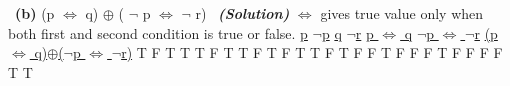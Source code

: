 \documentclass[a4 paper]{article}
\numberwithin{equation}{section}
\newcommand{\subproblem}[1]{~\newline\textbf{(#1)}}
\newcommand{\solution}{~\newline\textbf{\textit{(Solution)}} }
\newcommand{\0}{\mathbf{0}}
\begin{document}
\subproblem{b} (p $\iff$ q) $\oplus$ ( $\neg$ p $\iff$ $\neg$ r)
\solution 
\newline
\newline
    $\iff$ gives true value only when both first and second condition is true or false. 
\newline
\newline
    \underline{p}                       \hspace{1cm} 
    \underline{$\neg$p}                 \hspace{1cm} 
    \underline{q}                       \hspace{1cm}
    \underline{$\neg$r}                 \hspace{1cm}
    \underline{p $\iff$ q}              \hspace{1cm}
    \underline{$\neg$p $\iff$ $\neg$r}  \hspace{1cm}
    \underline{(p $\iff$ q)$\oplus$($\neg$p $\iff$ $\neg$r)}
\newline
\newline
    T \hspace{1cm} F \hspace{1.1cm} T \hspace{1cm} T \hspace{1.7cm} T \hspace{2.45cm} F \hspace{3.5cm} T
\newline
    T \hspace{1cm} F \hspace{1.1cm} T \hspace{1cm} F \hspace{1.7cm} T \hspace{2.45cm} T \hspace{3.5cm} F
\newline
    T \hspace{1cm} F \hspace{1.1cm} F \hspace{1cm} T \hspace{1.7cm} F \hspace{2.45cm} F \hspace{3.5cm} F
\newline
    T \hspace{1cm} F \hspace{1.1cm} F \hspace{1cm} F \hspace{1.7cm} F \hspace{2.45cm} T \hspace{3.5cm} T
\end{document}
